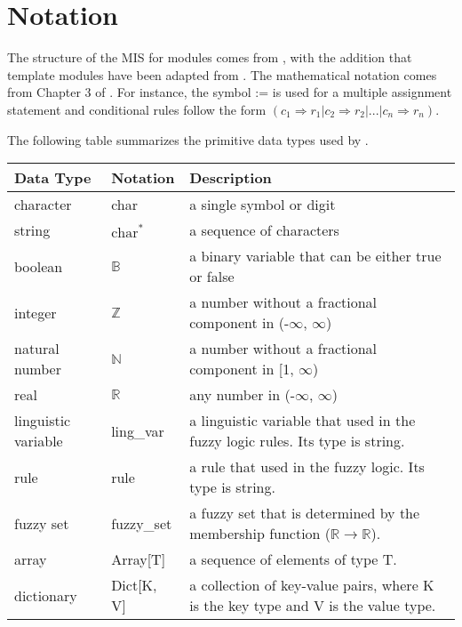 \documentclass[12pt, titlepage]{article}
\begin{document}
\section{Notation}


The structure of the MIS for modules comes from \citet{HoffmanAndStrooper1995},
with the addition that template modules have been adapted from
\cite{GhezziEtAl2003}.  The mathematical notation comes from Chapter 3 of
\citet{HoffmanAndStrooper1995}.  For instance, the symbol := is used for a
multiple assignment statement and conditional rules follow the form $(c_1
\Rightarrow r_1 | c_2 \Rightarrow r_2 | ... | c_n \Rightarrow r_n )$.

The following table summarizes the primitive data types used by \progname. 

\begin{center}
\renewcommand{\arraystretch}{1.2}
\noindent 
\begin{tabular}{l l p{7.5cm}} 
\toprule 
\textbf{Data Type} & \textbf{Notation} & \textbf{Description}\\ 
\midrule
character & char & a single symbol or digit\\
string & $\text{char}^*$ & a sequence of characters\\
boolean & $\mathbb{B}$ & a binary variable that can be either true or false\\
integer & $\mathbb{Z}$ & a number without a fractional component in (-$\infty$, $\infty$) \\
natural number & $\mathbb{N}$ & a number without a fractional component in [1, $\infty$) \\
real & $\mathbb{R}$ & any number in (-$\infty$, $\infty$)\\
linguistic variable & ling\_var & a linguistic variable that used in the fuzzy logic rules. 
                               Its type is string.\\
rule & rule & a rule that used in the fuzzy logic. Its type is string.\\
fuzzy set & fuzzy\_set & a fuzzy set that is determined 
by the membership function ($\mathbb{R} \rightarrow \mathbb{R}$).\\
array & Array[T] & a sequence of elements of type T.\\
dictionary & Dict[K, V] & a collection of key-value pairs, where K is the key type and V is the value type.\\
\bottomrule
\end{tabular} 
\end{center}
\end{document}
